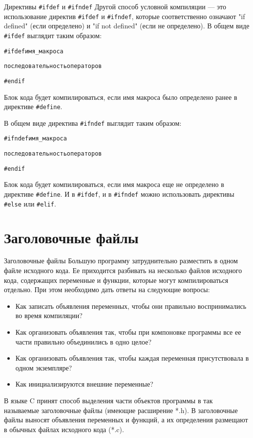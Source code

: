 \documentclass{beamer}
\begin{document}
\begin{frame}{Директивы \texttt{\#ifdef} и \texttt{\#ifndef}}
    Другой способ условной компиляции — это использование директив \texttt{\#ifdef} и \texttt{\#ifndef}, которые соответственно означают "if defined" (если определено) и "if not defined" (если не определено). В общем виде \texttt{\#ifdef} выглядит таким образом:
    
    \begin{alltt}
        \#ifdef имя\_макроса
        
        \qquad последовательность операторов
        
        \#endif
    \end{alltt}
    
    Блок кода будет компилироваться, если имя макроса было определено ранее в директиве \texttt{\#define}.
    
    В общем виде директива \texttt{\#ifndef} выглядит таким образом:
    
    \begin{alltt}
        \#ifndef имя\_макроса
        
        \qquad последовательность операторов
        
        \#endif
    \end{alltt}
    
    Блок кода будет компилироваться, если имя макроса еще не определено в директиве \texttt{\#define}. И в \texttt{\#ifdef}, и в \texttt{\#ifndef} можно использовать директивы \texttt{\#else} или \texttt{\#elif}.
\end{frame}

\section{Заголовочные файлы}

\begin{frame}{Заголовочные файлы}
    Большую программу затруднительно разместить в одном файле исходного кода. Ее приходится разбивать на несколько файлов исходного кода, содержащих переменные и функции, которые могут компилироваться отдельно. При этом необходимо дать ответы на следующие вопросы:
    
    \begin{itemize}
        \item Как записать объявления переменных, чтобы они правильно воспринимались во время компиляции?
        \item Как организовать объявления так, чтобы при компоновке программы все ее части правильно
        объединились в одно целое?
        \item Как организовать объявления так, чтобы каждая переменная присутствовала в одном экземпляре?
        \item Как инициализируются внешние переменные?
    \end{itemize}
    
    В языке C принят способ выделения части объектов программы в так называемые заголовочные файлы (имеющие расширение *.h). В заголовочные файлы выносят объявления переменных и функций, а их определения размещают в обычных файлах исходного кода (*.c).
\end{frame}
\end{document}
